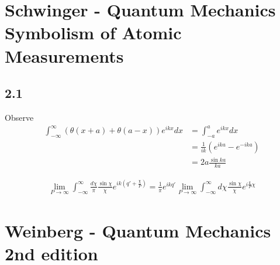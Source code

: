 \documentclass[../main.tex]{subfiles}
\begin{document}
\section{{\sc Schwinger} - Quantum Mechanics Symbolism of Atomic Measurements}
\subsection{2.1}
Observe
\begin{align}
    \int_{-\infty}^\infty\left(\theta(x+a)+\theta(a-x)\right)e^{ikx}dx
    &=\int_{-a}^ae^{ikx}dx\\
    &=\frac{1}{ik}\left(e^{ika}-e^{-ika}\right)\\
    &=2a \frac{\sin ka}{ka}
\end{align} 

\begin{align}
    \lim_{P\rightarrow\infty}\int_{-\infty}^\infty\frac{d\chi}{\pi}\frac{\sin\chi}{\chi}e^{ik\left(q'+\frac{\chi}{P}\right)}=\frac{1}{\pi}e^{ikq'}\lim_{P\rightarrow\infty}\int_{-\infty}^\infty d\chi\frac{\sin\chi}{\chi}e^{i\frac{k}{P}\chi}
\end{align} 



\section{{\sc Weinberg} - Quantum Mechanics 2nd edition}
\end{document}

